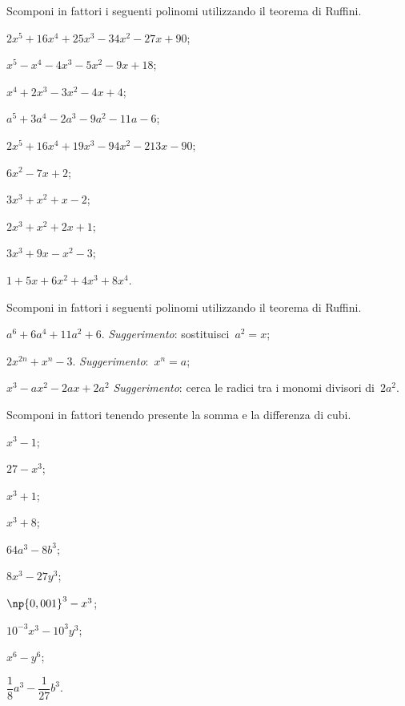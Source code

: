 \begin{esercizio}[\Ast]
\label{ese:13.70}
Scomponi in fattori i seguenti polinomi utilizzando il teorema di
Ruffini.
\begin{multicols}{2}
 \begin{enumeratea}
 \item $2x^{5}+16x^{4}+25x^{3}-34x^{2}-27x+90$;
\item $x^{5}-x^{4}-4x^{3}-5x^{2}-9x+18$;
\item $x^{4}+2x^{3}-3x^{2}-4x+4$;
\item $a^{5}+3a^{4}-2a^{3}-9a^{2}-11a-6$;
\item $2x^{5}+16x^{4}+19x^{3}-94x^{2}-213x-90$;
\item $6x^{2}-7x+2$;
\item $3x^{3}+x^{2}+x-2$;
\item $2x^{3}+x^{2}+2x+1$;
\item $3x^{3}+9x-x^{2}-3$;
\item $1+5x+6x^{2}+4x^{3}+8x^{4}$.
 \end{enumeratea}
\end{multicols}
\end{esercizio}

\begin{esercizio}[\Ast]
\label{ese:13.71}
Scomponi in fattori i seguenti polinomi utilizzando il teorema di
Ruffini.

 \begin{enumeratea}
 \item $a^{6}+6a^{4}+11a^{2}+6$. \emph{Suggerimento}: sostituisci~$a^{2}=x$;
\item $2x^{2n}+x^{n}-3$. \emph{Suggerimento}:~$x^{n}=a$;
\item $x^{3}-ax^{2}-2ax+2a^{2}$ \emph{Suggerimento}: cerca le radici tra i
monomi divisori di~$2a^{2}$.
 \end{enumeratea}
\end{esercizio}
\pagebreak
\begin{esercizio}
\label{ese:13.72}
 Scomponi in fattori tenendo presente la somma e la differenza di cubi.
 \begin{multicols}{3}
 \begin{enumeratea}
  \item $x^{3}-1$;
\item $27-x^{3}$;
\item $x^{3}+1$;
\item $x^{3}+8$;
\item $64a^{3}-8b^{3}$;
\item $8x^{3}-27y^{3}$;
\item $\np{0,001}^{3}-x^{3}$;
\item $10^{-3}x^{3}-10^{3}y^{3}$;
\item $x^{6}-y^{6}$;
\item $\dfrac{1}{8}a^{3}-\dfrac{1}{27}b^{3}$.
 \end{enumeratea}
 \end{multicols}
\end{esercizio}

